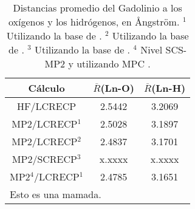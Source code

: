 \begin{table}[h!]
\centering  %
\caption{\footnotesize Distancias promedio del Gadolinio a los ox\'igenos
y los hidr\'ogenos, en {\AA}ngstr\"om.
{\footnotesize $^1$ Utilizando la base de \cite{Dolg1993}.} 
{\footnotesize $^2$ Utilizando la base de \cite{Yang2005}.}
{\footnotesize $^3$ Utilizando la base de \cite{Cao2002}.}  
{\footnotesize $^4$ Nivel SCS-MP2 \citep{Grim2003} y utilizando MPC 
\citep{Toma2005}.}}
\begin{tabular}{c|cc}\hline\hline
C\'alculo & $\overline R$(Ln-O) & $\overline R$(Ln-H) \\ \hline
HF/LCRECP & 2.5442 & 3.2069 \\ 
MP2/LCRECP$^1$ & 2.5028 & 3.1897  \\ 
MP2/LCRECP$^2$ & 2.4837 & 3.1701  \\ 
MP2/SCRECP$^3$ & x.xxxx & x.xxxx  \\ 
MP2$^4$/LCRECP$^1$ & 2.4785 & 3.1651  \\ 
\hline 
\multicolumn{3}{l}{\footnotesize{Esto es una mamada.}}
\end{tabular}\label{tDGd9+0}\end{table}

